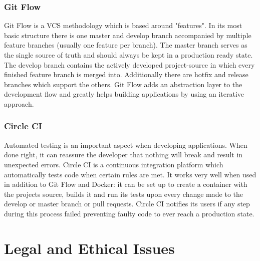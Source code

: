 \subsubsection{Git Flow}
Git Flow is a VCS methodology which is based around "features". In its most basic structure there is one master and develop branch accompanied by multiple feature branches (usually one feature per branch). The master branch serves as the single source of truth and should always be kept in a production ready state. The develop branch contains the actively developed project-source in which every finished feature branch is merged into. Additionally there are hotfix and release branches which support the others. Git Flow adds an abstraction layer to the development flow and greatly helps building applications by using an iterative approach.

\subsubsection{Circle CI}
Automated testing is an important aspect when developing applications. When done right, it can reassure the developer that nothing will break and result in unexpected errors. Circle CI is a continuous integration platform which automatically tests code when certain rules are met. It works very well when used in addition to Git Flow and Docker: it can be set up to create a container with the projects source, builds it and run its tests upon every change made to the develop or master branch or pull requests. Circle CI notifies its users if any step during this process failed preventing faulty code to ever reach a production state.

\section{Legal and Ethical Issues}